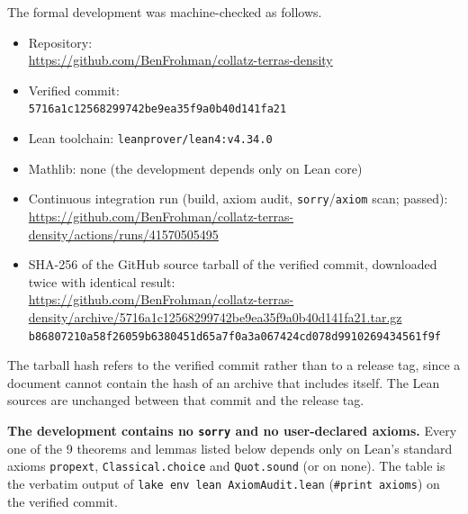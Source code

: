 \documentclass[11pt]{article}
\begin{document}
The formal development was machine-checked as follows.

{\raggedright
\begin{itemize}
\item Repository:\\ {\footnotesize\url{https://github.com/BenFrohman/collatz-terras-density}}
\item Verified commit:\\ {\footnotesize\texttt{5716a1c12568299742be9ea35f9a0b40d141fa21}}
\item Lean toolchain: \texttt{leanprover/lean4:v4.34.0}
\item Mathlib: none (the development depends only on Lean core)
\item Continuous integration run (build, axiom audit, \texttt{sorry}/\texttt{axiom} scan; passed):\\ {\footnotesize\url{https://github.com/BenFrohman/collatz-terras-density/actions/runs/41570505495}}
\item SHA-256 of the GitHub source tarball of the verified commit, downloaded twice with identical result:\\ {\footnotesize\url{https://github.com/BenFrohman/collatz-terras-density/archive/5716a1c12568299742be9ea35f9a0b40d141fa21.tar.gz}}\\
{\footnotesize\texttt{b86807210a58f26059b6380451d65a7f0a3a067424cd078d9910269434561f9f}}
\end{itemize}\par}

The tarball hash refers to the verified commit rather than to a release tag, since a document cannot contain the hash of an archive that includes itself. The Lean sources are unchanged between that commit and the release tag.

\textbf{The development contains no \texttt{sorry} and no user-declared axioms.} Every one of the 9 theorems and lemmas listed below depends only on Lean's standard axioms \texttt{propext}, \texttt{Classical.choice} and \texttt{Quot.sound} (or on none). The table is the verbatim output of \texttt{lake env lean AxiomAudit.lean} (\texttt{\#print axioms}) on the verified commit.
\end{document}
